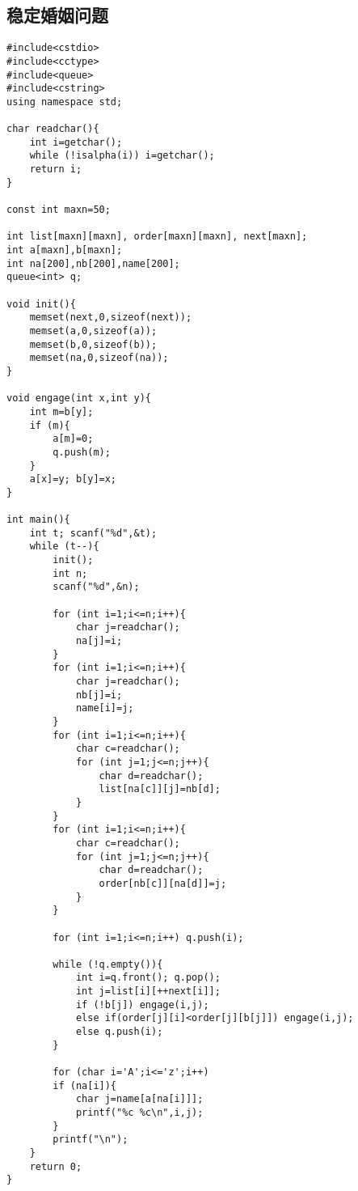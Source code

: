 \documentclass{article}
\begin{document}
\subsection{稳定婚姻问题}
\begin{lstlisting}
#include<cstdio>
#include<cctype>
#include<queue>
#include<cstring>
using namespace std;

char readchar(){
	int i=getchar();
	while (!isalpha(i)) i=getchar();
	return i;
}

const int maxn=50;

int list[maxn][maxn], order[maxn][maxn], next[maxn];
int a[maxn],b[maxn];
int na[200],nb[200],name[200];
queue<int> q;

void init(){
	memset(next,0,sizeof(next));
	memset(a,0,sizeof(a));
	memset(b,0,sizeof(b));
	memset(na,0,sizeof(na));
}	

void engage(int x,int y){
	int m=b[y];
	if (m){
		a[m]=0;
		q.push(m);
	}
	a[x]=y; b[y]=x;
}	

int main(){
	int t; scanf("%d",&t);
	while (t--){
		init();
		int n;
		scanf("%d",&n);
				
		for (int i=1;i<=n;i++){
			char j=readchar();
			na[j]=i;
		}
		for (int i=1;i<=n;i++){
			char j=readchar();
			nb[j]=i;
			name[i]=j;
		}
		for (int i=1;i<=n;i++){
			char c=readchar();
			for (int j=1;j<=n;j++){
				char d=readchar();
				list[na[c]][j]=nb[d];
			}
		}
		for (int i=1;i<=n;i++){
			char c=readchar();
			for (int j=1;j<=n;j++){
				char d=readchar();
				order[nb[c]][na[d]]=j;
			}
		}
		
		for (int i=1;i<=n;i++) q.push(i);
		
		while (!q.empty()){
			int i=q.front(); q.pop();
			int j=list[i][++next[i]];
			if (!b[j]) engage(i,j);
			else if(order[j][i]<order[j][b[j]]) engage(i,j);
			else q.push(i);
		}
		
		for (char i='A';i<='z';i++)
		if (na[i]){
			char j=name[a[na[i]]];
			printf("%c %c\n",i,j);
		}
		printf("\n");
	}
	return 0;
}
\end{lstlisting}
\end{document}
